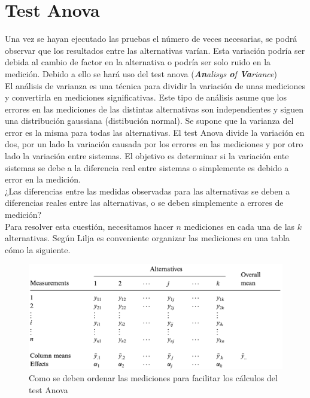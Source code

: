 \section{Test Anova}\label{anova_section}
Una vez se hayan ejecutado las pruebas el número de veces necesarias, se podrá observar que los resultados entre las alternativas varían. Esta variación podría ser debida al cambio de factor en la alternativa o podría ser solo ruido en la medición. Debido a ello se hará uso del test anova (\textit{\textbf{An}alisys \textbf{o}f \textbf{Va}riance})\\

El análisis de varianza es una técnica para dividir la variación de unas mediciones y convertirla en mediciones significativas. Este tipo de análisis asume que los errores en las mediciones de las distintas alternativas son independientes y siguen una distribución gaussiana (distibución normal). Se supone que la varianza del error es la misma para todas las alternativas. El test Anova divide la variación en dos, por un lado la variación causada por los errores en las mediciones y por otro lado la variación entre sistemas. El objetivo es determinar si la variación ente sistemas se debe a la diferencia real entre sistemas o simplemente es debido a error en la medición. \cite{lilja_2000} \\

¿Las diferencias entre las medidas observadas para las alternativas se deben a diferencias reales entre las alternativas, o se deben simplemente a errores de medición? \cite{lilja_2000} \\

Para resolver esta cuestión, necesitamos hacer $n$ mediciones en cada una de las $k$ alternativas. Según Lilja \cite{lilja_2000} es conveniente organizar las mediciones en una tabla cómo la siguiente. 
 
\begin{figure}[H]
    \centering
    \includegraphics[scale=0.6]{doc/assets/images/Capitulo3/lilja_recommend.png}
    \caption{Como se deben ordenar las mediciones para facilitar los cálculos del test Anova \cite{lilja_2000}}
    \label{fig:Anova_liljal}
\end{figure}

